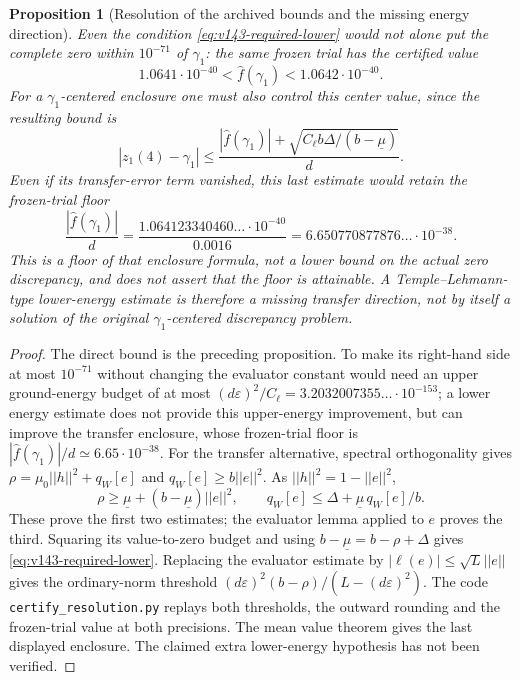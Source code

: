 \documentclass[11pt]{article}
\def\norm#1{||#1||}%
\newtheorem{proposition}[theorem]{Proposition}
\theoremstyle{remark}
\newcommand{\norm}[1]{\left\lVert #1\right\rVert}
\begin{document}
\begin{proposition}[Resolution of the archived bounds and the missing energy direction]
Even the condition \eqref{eq:v143-required-lower} would not alone
put the complete zero within $10^{-71}$ of $\gamma_1$: the same
frozen trial has the certified value
\[
 1.0641\cdot10^{-40}<\widehat f(\gamma_1)<1.0642\cdot10^{-40}.
\]
For a $\gamma_1$-centered enclosure one must also control this center
value, since the resulting bound is
\[
 |z_1(4)-\gamma_1|\le
 \frac{|\widehat f(\gamma_1)|+
       \sqrt{C_\ell b\Delta/(b-\underline\mu)}}d.
\]
Even if its transfer-error term vanished, this last estimate would
retain the frozen-trial floor
\[
 \frac{|\widehat f(\gamma_1)|}{d}
 =\frac{1.064123340460\ldots\cdot10^{-40}}{0.0016}
 =6.650770877876\ldots\cdot10^{-38}.
\]
This is a floor of that enclosure formula, not a lower bound on the
actual zero discrepancy, and does not assert that the floor is attainable.
A Temple--Lehmann-type lower-energy estimate is therefore a missing
\emph{transfer} direction, not by itself a solution of the original
$\gamma_1$-centered discrepancy problem.
\end{proposition}
\begin{proof}
The direct bound is the preceding proposition. To make its right-hand
side at most $10^{-71}$ without changing the evaluator constant would
need an upper ground-energy budget of at most
$(d\varepsilon)^2/C_\ell=3.2032007355\ldots\cdot10^{-153}$;
a lower energy estimate does not provide this upper-energy improvement,
but can improve the transfer enclosure, whose frozen-trial floor is
$|\widehat f(\gamma_1)|/d\simeq6.65\cdot10^{-38}$.
For the transfer alternative, spectral orthogonality gives
$\rho=\mu_0\norm h^2+q_W[e]$ and $q_W[e]\ge b\norm e^2$.
As $\norm h^2=1-\norm e^2$,
\[
 \rho\ge\underline\mu+(b-\underline\mu)\norm e^2,
 \qquad
 q_W[e]\le\Delta+\underline\mu\,q_W[e]/b.
\]
These prove the first two estimates; the evaluator lemma applied to $e$
proves the third. Squaring its value-to-zero budget and using
$b-\underline\mu=b-\rho+\Delta$ gives
\eqref{eq:v143-required-lower}. Replacing the evaluator estimate by
$|\ell(e)|\le\sqrt L\norm e$ gives the ordinary-norm threshold
$(d\varepsilon)^2(b-\rho)/(L-(d\varepsilon)^2)$.
The code \texttt{certify\_resolution.py} replays both thresholds,
the outward rounding and the frozen-trial value at both precisions.
The mean value theorem gives the last displayed enclosure. The
claimed extra lower-energy hypothesis has not been verified.
\end{proof}
\end{document}
